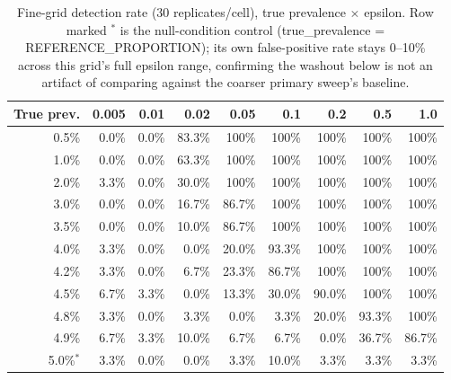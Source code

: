 \documentclass[11pt]{article}
\begin{document}
\begin{table}[H]
\centering
\footnotesize
\begin{tabular}{r*{8}{r}}
\toprule
True prev. & 0.005 & 0.01 & 0.02 & 0.05 & 0.1 & 0.2 & 0.5 & 1.0 \\
\midrule
0.5\%  & 0.0\%  & 0.0\%  & 83.3\% & 100\%  & 100\%  & 100\%  & 100\%  & 100\% \\
1.0\%  & 0.0\%  & 0.0\%  & 63.3\% & 100\%  & 100\%  & 100\%  & 100\%  & 100\% \\
2.0\%  & 3.3\%  & 0.0\%  & 30.0\% & 100\%  & 100\%  & 100\%  & 100\%  & 100\% \\
3.0\%  & 0.0\%  & 0.0\%  & 16.7\% & 86.7\% & 100\%  & 100\%  & 100\%  & 100\% \\
3.5\%  & 0.0\%  & 0.0\%  & 10.0\% & 86.7\% & 100\%  & 100\%  & 100\%  & 100\% \\
4.0\%  & 3.3\%  & 0.0\%  & 0.0\%  & 20.0\% & 93.3\% & 100\%  & 100\%  & 100\% \\
4.2\%  & 3.3\%  & 0.0\%  & 6.7\%  & 23.3\% & 86.7\% & 100\%  & 100\%  & 100\% \\
4.5\%  & 6.7\%  & 3.3\%  & 0.0\%  & 13.3\% & 30.0\% & 90.0\% & 100\%  & 100\% \\
4.8\%  & 3.3\%  & 0.0\%  & 3.3\%  & 0.0\%  & 3.3\%  & 20.0\% & 93.3\% & 100\% \\
4.9\%  & 6.7\%  & 3.3\%  & 10.0\% & 6.7\%  & 6.7\%  & 0.0\%  & 36.7\% & 86.7\% \\
5.0\%$^{*}$ & 3.3\% & 0.0\% & 0.0\% & 3.3\% & 10.0\% & 3.3\% & 3.3\% & 3.3\% \\
\bottomrule
\end{tabular}
\caption{Fine-grid detection rate (30 replicates/cell), true prevalence $\times$ epsilon. Row marked $^{*}$ is the null-condition control (true\_prevalence = REFERENCE\_PROPORTION); its own false-positive rate stays 0--10\% across this grid's full epsilon range, confirming the washout below is not an artifact of comparing against the coarser primary sweep's baseline.}
\label{tab:floor}
\end{table}
\end{document}
